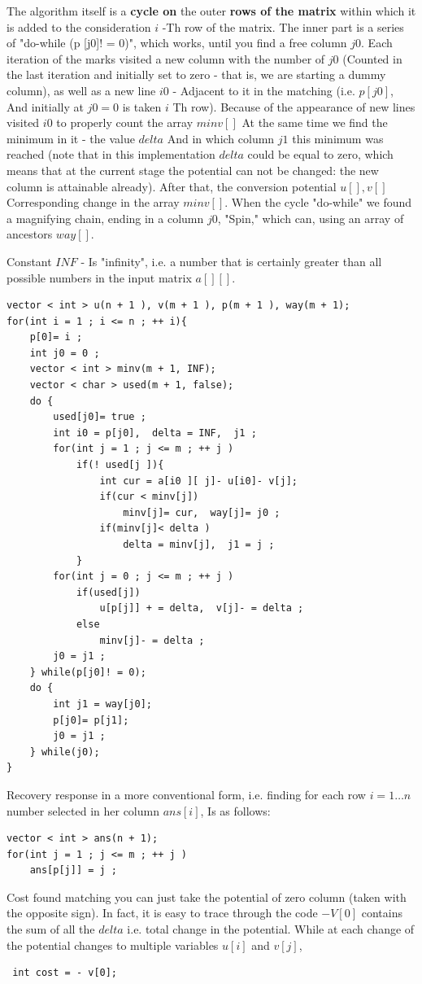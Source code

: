 The algorithm itself is a \textbf{cycle on} the outer \textbf{rows of the matrix} within which it is added to the consideration $i$ -Th row of the matrix. The inner part is a series of "do-while (p [j0]! = 0)", which works, until you find a free column $j0$. Each iteration of the marks visited a new column with the number of $j0$ (Counted in the last iteration and initially set to zero - that is, we are starting a dummy column), as well as a new line $i0$ - Adjacent to it in the matching (i.e. $p [j0]$, And initially at $j0 = 0$ is taken $i$ Th row). Because of the appearance of new lines visited $i0$ to properly count the array $minv []$ At the same time we find the minimum in it - the value $delta$ And in which column $j1$ this minimum was reached (note that in this implementation $delta$ could be equal to zero, which means that at the current stage the potential can not be changed: the new column is attainable already). After that, the conversion potential $u [], v []$ Corresponding change in the array $minv []$. When the cycle "do-while" we found a magnifying chain, ending in a column $j0$, "Spin," which can, using an array of ancestors $way []$.

Constant $INF$ - Is "infinity", i.e. a number that is certainly greater than all possible numbers in the input matrix $a [][]$.

\begin{verbatim}
vector < int > u(n + 1 ), v(m + 1 ), p(m + 1 ), way(m + 1);
for(int i = 1 ; i <= n ; ++ i){
    p[0]= i ;
    int j0 = 0 ;
    vector < int > minv(m + 1, INF);
    vector < char > used(m + 1, false);
    do {
        used[j0]= true ;
        int i0 = p[j0],  delta = INF,  j1 ;
        for(int j = 1 ; j <= m ; ++ j )
            if(! used[j ]){
                int cur = a[i0 ][ j]- u[i0]- v[j];
                if(cur < minv[j])
                    minv[j]= cur,  way[j]= j0 ;
                if(minv[j]< delta )
                    delta = minv[j],  j1 = j ;
            }
        for(int j = 0 ; j <= m ; ++ j )
            if(used[j])
                u[p[j]] + = delta,  v[j]- = delta ;
            else
                minv[j]- = delta ;
        j0 = j1 ;
    } while(p[j0]! = 0);
    do {
        int j1 = way[j0];
        p[j0]= p[j1];
        j0 = j1 ;
    } while(j0);
} 
\end{verbatim}
Recovery response in a more conventional form, i.e. finding for each row $i = 1 \ldots n$ number selected in her column $ans [i]$, Is as follows:

\begin{verbatim}
vector < int > ans(n + 1);
for(int j = 1 ; j <= m ; ++ j )
    ans[p[j]] = j ; 
\end{verbatim}
Cost found matching you can just take the potential of zero column (taken with the opposite sign). In fact, it is easy to trace through the code $-V [0]$ contains the sum of all the $delta$ i.e. total change in the potential. While at each change of the potential changes to multiple variables $u [i]$ and $v [j]$,
\begin{verbatim}
 int cost = - v[0]; 
\end{verbatim}
